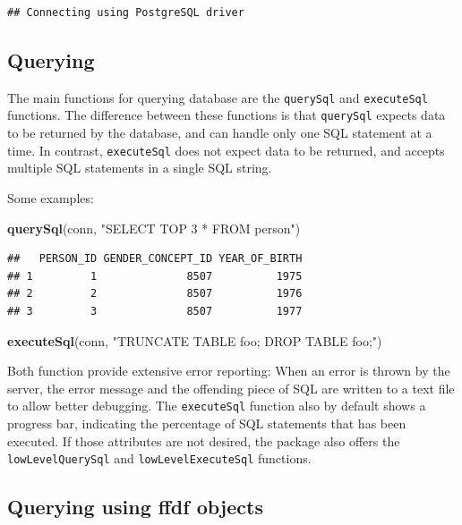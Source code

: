 \documentclass[]{book}
\newenvironment{Shaded}{\begin{snugshade}}{\end{snugshade}}
\newcommand{\KeywordTok}[1]{\textcolor[rgb]{0.13,0.29,0.53}{\textbf{#1}}}
\newcommand{\StringTok}[1]{\textcolor[rgb]{0.31,0.60,0.02}{#1}}
\newcommand{\NormalTok}[1]{#1}
\begin{document}
\begin{verbatim}
## Connecting using PostgreSQL driver
\end{verbatim}

\subsection{Querying}\label{querying}

The main functions for querying database are the \texttt{querySql} and
\texttt{executeSql} functions. The difference between these functions is
that \texttt{querySql} expects data to be returned by the database, and
can handle only one SQL statement at a time. In contrast,
\texttt{executeSql} does not expect data to be returned, and accepts
multiple SQL statements in a single SQL string.

Some examples:

\begin{Shaded}
\begin{Highlighting}[]
\KeywordTok{querySql}\NormalTok{(conn, }\StringTok{"SELECT TOP 3 * FROM person"}\NormalTok{)}
\end{Highlighting}
\end{Shaded}

\begin{verbatim}
##   PERSON_ID GENDER_CONCEPT_ID YEAR_OF_BIRTH
## 1         1              8507          1975
## 2         2              8507          1976
## 3         3              8507          1977
\end{verbatim}

\begin{Shaded}
\begin{Highlighting}[]
\KeywordTok{executeSql}\NormalTok{(conn, }\StringTok{"TRUNCATE TABLE foo; DROP TABLE foo;"}\NormalTok{)}
\end{Highlighting}
\end{Shaded}

Both function provide extensive error reporting: When an error is thrown
by the server, the error message and the offending piece of SQL are
written to a text file to allow better debugging. The
\texttt{executeSql} function also by default shows a progress bar,
indicating the percentage of SQL statements that has been executed. If
those attributes are not desired, the package also offers the
\texttt{lowLevelQuerySql} and \texttt{lowLevelExecuteSql} functions.

\subsection{Querying using ffdf
objects}\label{querying-using-ffdf-objects}
\end{document}
